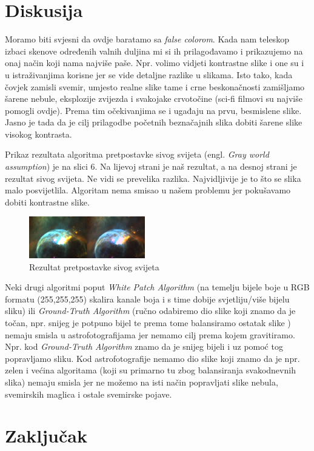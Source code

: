 \documentclass[conference]{IEEEtran}
\begin{document}
\section{Diskusija}

Moramo biti svjesni da ovdje baratamo sa \textit{false colorom}. Kada nam teleskop izbaci skenove određenih valnih duljina mi si ih prilagođavamo i prikazujemo na onaj način koji nama najviše paše. Npr. volimo vidjeti kontrastne slike i one su i u istraživanjima korisne jer se vide detaljne razlike u slikama. Isto tako, kada čovjek zamisli svemir, umjesto realne slike tame i crne beskonačnosti zamišljamo šarene nebule, eksplozije zvijezda i svakojake crvotočine (sci-fi filmovi su najviše pomogli ovdje). Prema tim očekivanjima se i ugađaju na prvu, besmislene slike. Jasno je tada da je cilj prilagodbe početnih beznačajnih slika dobiti šarene slike visokog kontrasta.

Prikaz rezultata algoritma pretpostavke sivog svijeta (engl. \textit{Gray world assumption}) je na slici 6. Na lijevoj strani je naš rezultat, a na desnoj strani je rezultat sivog svijeta. Ne vidi se prevelika razlika. Najvidljivije je to što se slika malo posvijetlila. Algoritam nema smisao u našem problemu jer pokušavamo dobiti kontrastne slike.
\begin{figure}[h]
    \centering
    \includegraphics[width=0.45\textwidth]{greyworld}
    \caption{Rezultat pretpostavke sivog svijeta}
    \label{slika:s5}
\end{figure}

Neki drugi algoritmi poput \textit{White Patch Algorithm} (na temelju bijele boje u RGB formatu (255,255,255) skalira kanale boja i s time dobije svjetliju/više bijelu sliku) ili \textit{Ground-Truth Algorithm} (ručno odabiremo dio slike koji znamo da je točan, npr. snijeg je potpuno bijel te prema tome balansiramo ostatak slike \cite{Nigam2021}) nemaju smisla u astrofotografijama jer nemamo cilj prema kojem gravitiramo. Npr. kod \textit{Ground-Truth Algorithm} znamo da je snijeg bijeli i uz pomoć tog popravljamo sliku. Kod astrofotografije nemamo dio slike koji znamo da je npr. zelen i većina algoritama (koji su primarno tu zbog balansiranja svakodnevnih slika) nemaju smisla jer ne možemo na isti način popravljati slike nebula, svemirskih maglica i ostale svemirske pojave.



\section{Zaključak}

\listoffigures


\vspace{12pt}
\end{document}
